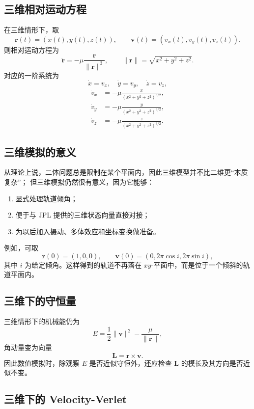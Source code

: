 \subsection{三维相对运动方程}

在三维情形下\cite{MurrayDermott1999,BateMuellerWhite1971}，取
\[
\bm r(t)=(x(t),y(t),z(t)),
\qquad
\bm v(t)=(v_x(t),v_y(t),v_z(t)).
\]
则相对运动方程为
\[
\ddot{\bm r}=-\mu \frac{\bm r}{\|\bm r\|^3},
\qquad
\|\bm r\|=\sqrt{x^2+y^2+z^2}.
\]
对应的一阶系统为
\[
\dot x=v_x,\quad \dot y=v_y,\quad \dot z=v_z,
\]
\begin{align*}
\dot v_x&=-\mu \frac{x}{(x^2+y^2+z^2)^{3/2}},\\
\dot v_y&=-\mu \frac{y}{(x^2+y^2+z^2)^{3/2}},\\
\dot v_z&=-\mu \frac{z}{(x^2+y^2+z^2)^{3/2}}.
\end{align*}

\subsection{三维模拟的意义}

从理论上说，二体问题总是限制在某个平面内，因此三维模型并不比二维更“本质复杂”；
但三维模拟仍然很有意义，因为它能够：
\begin{enumerate}[label=\arabic*.]
  \item 显式处理轨道倾角；
  \item 便于与 JPL 提供的三维状态向量直接对接\cite{JPLHorizonsManual}；
  \item 为以后加入摄动、多体效应和坐标变换做准备。
\end{enumerate}

例如，可取
\[
\bm r(0)=(1,0,0),
\qquad
\bm v(0)=\left(0,2\pi\cos i,2\pi\sin i\right),
\]
其中 \(i\) 为给定倾角。这样得到的轨道不再落在 \(xy\)-平面中，而是位于一个倾斜的轨道平面内。

\subsection{三维下的守恒量}

三维情形下的机械能仍为\cite{MurrayDermott1999}
\[
E=\frac12\|\bm v\|^2-\frac{\mu}{\|\bm r\|},
\]
角动量变为向量
\[
\bm L=\bm r\times \bm v.
\]
因此数值模拟时，除观察 \(E\) 是否近似守恒外，还应检查 \(\bm L\) 的模长及其方向是否近似不变。

\subsection{三维下的 Velocity-Verlet}

